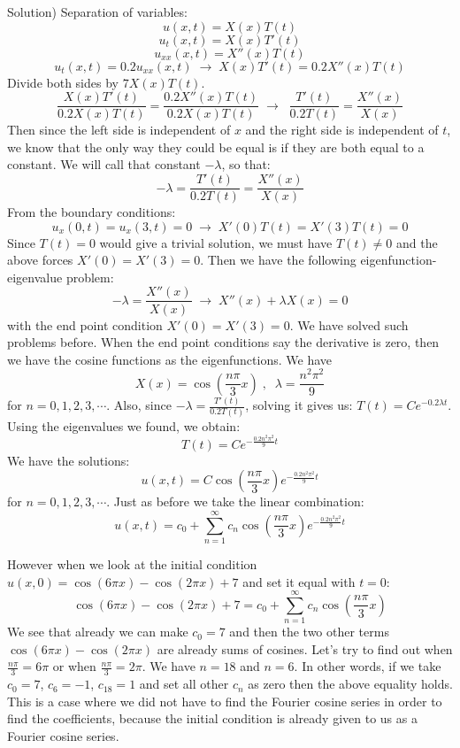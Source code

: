 \documentclass[12pt]{report}
\begin{document}
Solution)
Separation of variables:
$$u(x,t)=X(x)T(t)$$
$$u_t(x,t) = X(x) T'(t)$$
$$u_{xx}(x,t) = X''(x) T(t)$$
$$u_t(x,t) = 0.2 u_{xx}(x,t)  \; \rightarrow \; X(x) T'(t) = 0.2 X''(x) T(t) $$
Divide both sides by $7X(x)T(t)$.
$$\frac{X(x) T'(t)}{0.2X(x)T(t)} = \frac{0.2 X''(x) T(t)}{0.2X(x)T(t)}  \; \rightarrow \; \; \frac{T'(t)}{0.2T(t)} = \frac{X''(x)}{X(x)} $$
Then since the left side is independent of $x$ and the right side is independent of $t$, we know that the only way they could be equal is if they are both equal to a constant. We will call that constant $-\lambda$, so that:
$$-\lambda=\frac{T'(t)}{0.2T(t)} = \frac{X''(x)}{X(x)} $$
From the boundary conditions:
$$u_x(0,t)=u_x(3,t)=0  \; \rightarrow \; X'(0)T(t)=X'(3)T(t)=0$$
Since $T(t)=0$ would give a trivial solution, we must have $T(t)\neq0$ and the above forces $X'(0)=X'(3)=0$.
Then we have the following eigenfunction-eigenvalue problem:
$$-\lambda = \frac{X''(x)}{X(x)}  \; \rightarrow \; X''(x) + \lambda X(x) =0$$
with the end point condition $X'(0)=X'(3)=0$. We have solved such problems before. When the end point conditions say the derivative is zero, then we have the cosine functions as the eigenfunctions. We have
$$X(x) = \cos \left( \frac{n \pi}{3} x \right)   \; , \; \; \lambda = \frac{n^2 \pi^2}{9} $$
for $n=0,1,2,3, \cdots $.
Also, since $-\lambda=\frac{T'(t)}{0.2T(t)}$, solving it gives us: $T(t) = C e^{-0.2\lambda t}$. Using the eigenvalues we found, we obtain:
$$T(t) =  C e^{-\frac{0.2n^2 \pi^2}{9} t}$$
We have the solutions:
$$u(x,t) = C \cos \left( \frac{n \pi}{3} x \right) e^{-\frac{0.2 n^2 \pi^2}{9} t}$$
for $n=0,1,2,3, \cdots $.
Just as before we take the linear combination:
$$u(x,t) = c_0 + \sum_{n=1}^{\infty} c_n \cos \left( \frac{n \pi}{3} x \right) e^{-\frac{0.2 n^2 \pi^2}{9} t}$$

However when we look at the initial condition $u(x,0)=\cos(6\pi x) - \cos(2\pi x) + 7 $ and set it equal with $t=0$:
$$\cos(6\pi x) - \cos(2\pi x) + 7  =  c_0 + \sum_{n=1}^{\infty} c_n \cos \left( \frac{n \pi}{3} x \right) $$
We see that already we can make $c_0=7$ and then the two other terms $\cos(6\pi x) - \cos(2\pi x)$ are already sums of cosines. Let's try to find out when $\frac{n \pi}{3} =6 \pi$ or when $\frac{n \pi}{3} =2 \pi$. We have $n=18$ and $ n=6$. In other words, if we take $c_0=7$, $c_6=-1$, $c_{18}=1$ and set all other $c_n$ as zero then the above equality holds. This is a case where we did not have to find the Fourier cosine series in order to find the coefficients, because the initial condition is already given to us as a Fourier cosine series.
\end{document}
